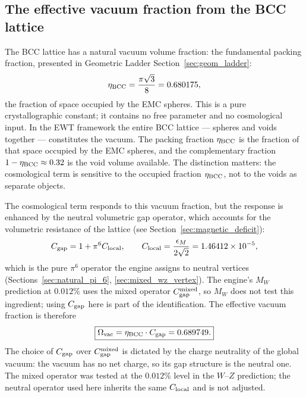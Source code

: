 \documentclass[10pt,a4paper]{article}
\begin{document}
\subsection{The effective vacuum fraction from the BCC lattice}
\label{sec:summary_vacuum_fraction}

The BCC lattice has a natural vacuum volume fraction: the fundamental packing
fraction, presented in Geometric Ladder Section~\ref{sec:geom_ladder}: 
\begin{equation}
	\eta_{\rm BCC} = \frac{\pi\sqrt{3}}{8} = 0.680175,
	\label{eq:summary_eta_BCC}
\end{equation}
the fraction of space occupied by the EMC spheres. This is a pure
crystallographic constant; it contains no free parameter and no
cosmological input. In the EWT framework the entire BCC lattice --- spheres and voids
together --- constitutes the vacuum. The packing fraction
\(\eta_{\rm BCC}\) is the fraction of that space occupied by the EMC
spheres, and the complementary fraction
\(1 - \eta_{\rm BCC} \approx 0.32\) is the void volume available. The distinction matters: the cosmological term is
sensitive to the occupied fraction \(\eta_{\rm BCC}\), not to the
voids as separate objects.

The cosmological term responds to this vacuum fraction, but the
response is enhanced by the neutral volumetric gap operator, which accounts for the volumetric resistance of the lattice (see Section~\ref{sec:magnetic_deficit}): 
\begin{equation}
	C_{\rm gap} = 1 + \pi^6 C_{\rm local},
	\qquad
	C_{\rm local} = \frac{\epsilon_M}{2\sqrt{2}} = 1.46412\times 10^{-5},
	\label{eq:summary_Cgap}
\end{equation}
which is the pure $\pi^6$ operator the engine assigns to neutral
vertices (Sections~\ref{sec:natural_pi_6}, \ref{sec:mixed_wz_vertex}). The engine's \(M_W\)
prediction at $0.012\%$ uses the mixed operator
$C_{\rm gap}^{\rm mixed}$, so \(M_W\) does not test this ingredient;
using $C_{\rm gap}$ here is part of the identification. The
effective vacuum fraction is therefore
\begin{equation}
	\boxed{
		\Omega_{\rm vac} = \eta_{\rm BCC}\cdot C_{\rm gap} = 0.689749.
	}
	\label{eq:summary_omega_value}
\end{equation}
The choice of $C_{\rm gap}$ over $C_{\rm gap}^{\rm mixed}$ is dictated
by the charge neutrality of the global vacuum: the vacuum has no net
charge, so its gap structure is the neutral one. The mixed operator
was tested at the $0.012\%$ level in the \(W\)--\(Z\) prediction; the
neutral operator used here inherits the same $C_{\rm local}$ and is
not adjusted.
\end{document}
